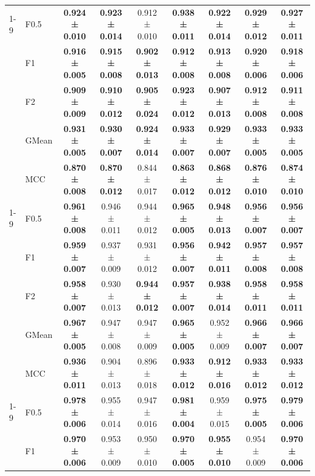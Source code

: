 \begin{table}[H]
{\begin{tabular}{llccccccc}
\cline{1-9}
\multirow[t]{5}{*}{GaussianNB} & F0.5 & \textbf{0.924 ± 0.010} & \textbf{0.923 ± 0.014} & 0.912 ± 0.010 & \textbf{0.938 ± 0.011} & \textbf{0.922 ± 0.014} & \textbf{0.929 ± 0.012} & \textbf{0.927 ± 0.011} \\
 & F1 & \textbf{0.916 ± 0.005} & \textbf{0.915 ± 0.008} & \textbf{0.902 ± 0.013} & \textbf{0.912 ± 0.008} & \textbf{0.913 ± 0.008} & \textbf{0.920 ± 0.006} & \textbf{0.918 ± 0.006} \\
 & F2 & \textbf{0.909 ± 0.009} & \textbf{0.910 ± 0.012} & \textbf{0.905 ± 0.024} & \textbf{0.923 ± 0.012} & \textbf{0.907 ± 0.013} & \textbf{0.912 ± 0.008} & \textbf{0.911 ± 0.008} \\
 & GMean & \textbf{0.931 ± 0.005} & \textbf{0.930 ± 0.007} & \textbf{0.924 ± 0.014} & \textbf{0.933 ± 0.007} & \textbf{0.929 ± 0.007} & \textbf{0.933 ± 0.005} & \textbf{0.933 ± 0.005} \\
 & MCC & \textbf{0.870 ± 0.008} & \textbf{0.870 ± 0.012} & 0.844 ± 0.017 & \textbf{0.863 ± 0.012} & \textbf{0.868 ± 0.012} & \textbf{0.876 ± 0.010} & \textbf{0.874 ± 0.010} \\
\cline{1-9}
\multirow[t]{5}{*}{LGBM()} & F0.5 & \textbf{0.961 ± 0.008} & 0.946 ± 0.011 & 0.944 ± 0.012 & \textbf{0.965 ± 0.005} & \textbf{0.948 ± 0.013} & \textbf{0.956 ± 0.007} & \textbf{0.956 ± 0.007} \\
 & F1 & \textbf{0.959 ± 0.007} & 0.937 ± 0.009 & 0.931 ± 0.012 & \textbf{0.956 ± 0.007} & \textbf{0.942 ± 0.011} & \textbf{0.957 ± 0.008} & \textbf{0.957 ± 0.008} \\
 & F2 & \textbf{0.958 ± 0.007} & 0.930 ± 0.013 & \textbf{0.944 ± 0.012} & \textbf{0.957 ± 0.007} & \textbf{0.938 ± 0.014} & \textbf{0.958 ± 0.011} & \textbf{0.958 ± 0.011} \\
 & GMean & \textbf{0.967 ± 0.005} & 0.947 ± 0.008 & 0.947 ± 0.009 & \textbf{0.965 ± 0.005} & 0.952 ± 0.009 & \textbf{0.966 ± 0.007} & \textbf{0.966 ± 0.007} \\
 & MCC & \textbf{0.936 ± 0.011} & 0.904 ± 0.013 & 0.896 ± 0.018 & \textbf{0.933 ± 0.012} & \textbf{0.912 ± 0.016} & \textbf{0.933 ± 0.012} & \textbf{0.933 ± 0.012} \\
\cline{1-9}
\multirow[t]{5}{*}{LogisticRegression()} & F0.5 & \textbf{0.978 ± 0.006} & 0.955 ± 0.014 & 0.947 ± 0.016 & \textbf{0.981 ± 0.004} & 0.959 ± 0.015 & \textbf{0.975 ± 0.005} & \textbf{0.979 ± 0.006} \\
 & F1 & \textbf{0.970 ± 0.006} & 0.953 ± 0.009 & 0.950 ± 0.010 & \textbf{0.970 ± 0.005} & \textbf{0.955 ± 0.010} & 0.954 ± 0.009 & \textbf{0.970 ± 0.006} \\

\end{tabular}}
\end{table}
